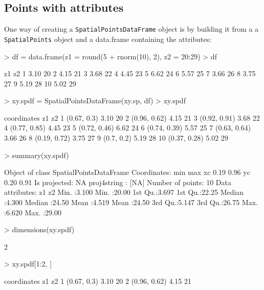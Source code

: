 \documentclass{article}
\begin{document}
\subsection{Points with attributes}

One way of creating a {\tt SpatialPointsDataFrame} object is by building
it from a a {\tt SpatialPoints} object and a data.frame containing
the attributes:
\begin{Schunk}
\begin{Sinput}
> df = data.frame(z1 = round(5 + rnorm(10), 2), z2 = 20:29)
> df
\end{Sinput}
\begin{Soutput}
     z1 z2
1  3.10 20
2  4.15 21
3  3.68 22
4  4.45 23
5  6.62 24
6  5.57 25
7  3.66 26
8  3.75 27
9  5.19 28
10 5.02 29
\end{Soutput}
\begin{Sinput}
> xy.spdf = SpatialPointsDataFrame(xy.sp, df)
> xy.spdf
\end{Sinput}
\begin{Soutput}
    coordinates   z1 z2
1   (0.67, 0.3) 3.10 20
2  (0.96, 0.62) 4.15 21
3  (0.92, 0.91) 3.68 22
4  (0.77, 0.85) 4.45 23
5  (0.72, 0.46) 6.62 24
6  (0.74, 0.39) 5.57 25
7  (0.63, 0.64) 3.66 26
8  (0.19, 0.72) 3.75 27
9    (0.7, 0.2) 5.19 28
10 (0.37, 0.28) 5.02 29
\end{Soutput}
\begin{Sinput}
> summary(xy.spdf)
\end{Sinput}
\begin{Soutput}
Object of class SpatialPointsDataFrame
Coordinates:
    min  max
xc 0.19 0.96
yc 0.20 0.91
Is projected: NA 
proj4string : [NA]
Number of points: 10
Data attributes:
       z1              z2       
 Min.   :3.100   Min.   :20.00  
 1st Qu.:3.697   1st Qu.:22.25  
 Median :4.300   Median :24.50  
 Mean   :4.519   Mean   :24.50  
 3rd Qu.:5.147   3rd Qu.:26.75  
 Max.   :6.620   Max.   :29.00  
\end{Soutput}
\begin{Sinput}
> dimensions(xy.spdf)
\end{Sinput}
\begin{Soutput}
[1] 2
\end{Soutput}
\begin{Sinput}
> xy.spdf[1:2, ]
\end{Sinput}
\begin{Soutput}
   coordinates   z1 z2
1  (0.67, 0.3) 3.10 20
2 (0.96, 0.62) 4.15 21
\end{Soutput}
\begin{Sinput}

\end{Sinput}
\end{Schunk}
\end{document}
